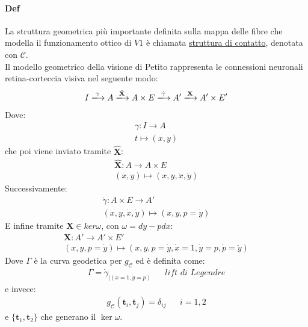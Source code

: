 \paragraph*{Def}La struttura geometrica più importante definita sulla mappa delle fibre che modella il funzionamento ottico di $V1$ è chiamata \underline{struttura di contatto}, denotata con $\mathcal{C}$.\\
Il modello geometrico della visione di Petito rappresenta le connessioni neuronali retina-corteccia visiva nel seguente modo:
\begin{align*}
    I\xlongrightarrow[]{\gamma}A \xlongrightarrow[]{\hat{\mathbf{X}}}A\times E\xlongrightarrow[]{\dot{\gamma}}A'\xlongrightarrow[]{\mathbf{X}}A'\times E'
\end{align*}
Dove:
\begin{align*}
    \gamma \colon I \to A\\
    t\mapsto (x,y)
\end{align*}
che poi viene inviato tramite $\hat{\mathbf{X}}$:
\begin{align*}
    \hat{\mathbf{X}}\colon A \to A\times E\\
    (x,y)\mapsto (x,y,\dot{x},\dot{y})
\end{align*}
Successivamente:
\begin{align*}
    \dot{\gamma}\colon A\times E\to A'\\
    (x,y,\dot{x},\dot{y})\mapsto (x,y,p=\dot{y})
\end{align*}
E infine tramite $\mathbf{X}\in ker\omega$, con $\omega=dy-pdx$:
\begin{align*}
    \mathbf{X}\colon A'\to A'\times E'\\
    (x,y,p=\dot{y})\mapsto (x,y,p=\dot{y},\dot{x}=1,\dot{y}=p,\dot{p}=\ddot{y})
\end{align*}
Dove $\Gamma$ è la curva geodetica per $g_{\mathcal{C}}$ ed è definita come:
\begin{align*}
    \Gamma= \dot{\gamma}_{|(\dot{x}=1,\dot{y}=p)} && \textit{lift di Legendre}
\end{align*}
e invece:
\begin{align*}
    g_{\mathcal{C}}(\mathbf{t}_i,\mathbf{t}_j)=\delta_{ij}&& i=1,2
\end{align*}
e $\{\mathbf{t}_1,\mathbf{t}_2\}$ che generano il $\ker\omega$.
